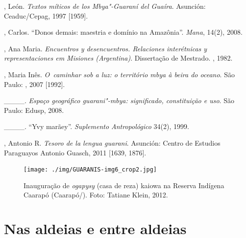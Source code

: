 \begin{Parskip}
\begin{samepage}
, León. \emph{Textos míticos de los Mbya"-Guaraní del Guaíra}. Asunción:
Ceaduc/Cepag, 1997 [1959].

, Carlos. ``Donos demais: maestria e domínio na Amazônia''. \emph{Mana},
14(2), 2008. 

 , Ana Maria. \emph{Encuentros y desencuentros. Relaciones
interétnicas y representaciones em Misiones (Argentina)}. Dissertação de
Mestrado. , 1982.

, Maria Inês. \emph{O~caminhar sob a luz: o território mbya à beira do
oceano}. São Paulo: , 2007 [1992].

\_\_\_\_. \emph{Espaço geográfico guarani"-mbya: significado, constituição e uso}.
São Paulo: Edusp, 2008.

\_\_\_\_. ``Yvy marãey''. \emph{Suplemento Antropológico} 34(2), 1999.

, Antonio R. \emph{Tesoro de la lengua guarani}. Asunción: Centro de
Estudios Paraguayos Antonio Guasch, 2011 [1639, 1876].
\end{samepage}
\end{Parskip}

\pagebreak

\begin{absolutelynopagebreak}
\begin{vplace}
\begin{figure}[H]
\begin{adjustwidth}{-2.7cm}{}
 \vspace{-3.1cm}
 \texttt{[image: ./img/GUARANIS-img6\_crop2.jpg]}	
  \end{adjustwidth}
  \caption{Inauguração de \emph{ogapysy} (casa de reza) kaiowa na Reserva Indígena
Caarapó (Caarapó/). Foto: Tatiane Klein, 2012.}
\end{figure}
\end{vplace}

\end{absolutelynopagebreak}

\thispagestyle{empty}

\makeatletter\@openrightfalse
\movetooddpage
\part{Nas aldeias e entre aldeias}

